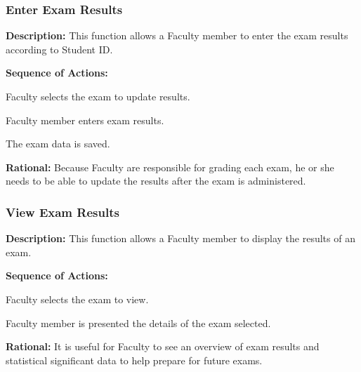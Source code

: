    \subsubsection{\large Enter Exam Results} 
   \begin{boxed} %
      \textbf{Description:}
      {\small This function allows a Faculty member to enter the exam results
         according to Student ID.}
         
         \textbf{Sequence of Actions:}
         \begin{enumerate}
               {\small
            \item Faculty selects the exam to update results.
            \item Faculty member enters exam results.
            \item The exam data is saved. }
         \end{enumerate}

         \textbf{Rational:}
         {\small Because Faculty are responsible for grading each exam, he or she needs
         to be able to update the results after the exam is administered.}
   \end{boxed} %

   \subsubsection{\large View Exam Results} 
   \begin{boxed} %
      \textbf{Description:}
      {\small This function allows a Faculty member to display the results of an
         exam.}
         
         \textbf{Sequence of Actions:}
         \begin{enumerate}
               {\small
            \item Faculty selects the exam to view.
            \item Faculty member is presented the details of the exam selected.}
         \end{enumerate}

         \textbf{Rational:}
         {\small It is useful for Faculty to see an overview of exam results and
         statistical significant data to help prepare for future exams.}
   \end{boxed} %

